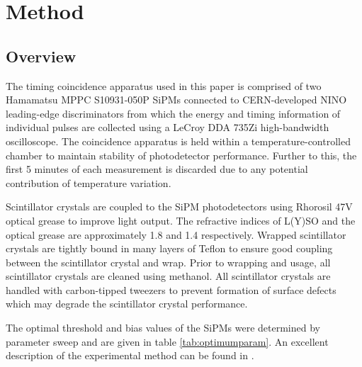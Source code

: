 \section{Method}
\label{sec:method}
\subsection{Overview}
The timing coincidence apparatus used in this paper is comprised of two Hamamatsu MPPC S10931-050P SiPMs connected to CERN-developed NINO leading-edge discriminators from which the energy and timing information of individual pulses are collected using a LeCroy DDA 735Zi high-bandwidth oscilloscope. The coincidence apparatus is held within a temperature-controlled chamber to maintain stability of photodetector performance. Further to this, the first 5 minutes of each measurement is discarded due to any potential contribution of temperature variation.

Scintillator crystals are coupled to the SiPM photodetectors using Rhorosil 47V optical grease to improve light output. The refractive indices of L(Y)SO and the optical grease are approximately 1.8 \cite{Erdei2012781} and 1.4 \cite{rhodorsilgrease} respectively. Wrapped scintillator crystals are tightly bound in many layers of Teflon to ensure good coupling between the scintillator crystal and wrap. Prior to wrapping and usage, all scintillator crystals are cleaned using methanol. All scintillator crystals are handled with carbon-tipped tweezers to prevent formation of surface defects which may degrade the scintillator crystal performance. 

The optimal threshold and bias values of the SiPMs were determined by parameter sweep and are given in table \ref{tab:optimumparam}. An excellent description of the experimental method can be found in \cite{ch_Meyer_Pizzichemi_Lecoq_2013}.
